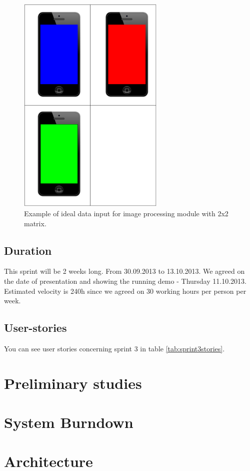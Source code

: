 \begin{figure}[H]
	\centering
		\includegraphics[width=7cm]{sprint3/sprint3_goal.pdf}
	\caption{Example of ideal data input for image processing module with 2x2 matrix.}
	\label{img:sprint3_goal}
\end{figure}

\subsection{Duration}
This sprint will be 2 weeks long. From 30.09.2013 to 13.10.2013.
We agreed on the date of presentation and showing the running demo - Thursday 11.10.2013.
Estimated velocity is 240h since we agreed on 30 working hours per person per week.

\subsection{User-stories}
You can see user stories concerning sprint 3 in table \ref{tab:sprint3stories}.

\section{Preliminary studies}

\section{System Burndown}
\section{Architecture}

